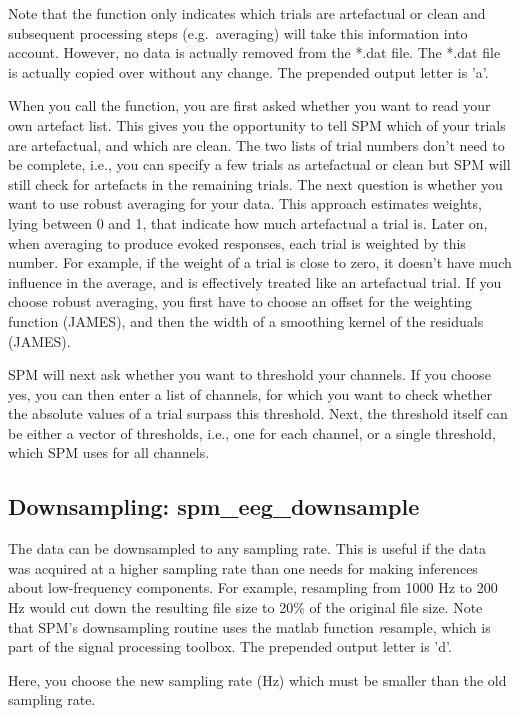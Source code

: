 Note that the function only indicates which trials are artefactual or
clean and subsequent processing steps (e.g.~averaging) will take this 
information into account. However, no data is actually removed from
the *.dat file. The *.dat file is actually copied over without any
change. The prepended output letter is 'a'.

When you call the function, you are first asked whether you want
to read your own artefact list. This gives you the opportunity to 
tell SPM which of your trials are artefactual, and which are clean. 
The two lists of trial numbers don't need to be complete, i.e., you can specify a
few trials as artefactual or clean but SPM will still check for artefacts in the remaining trials.
The next question is whether you want to use robust averaging for your data.
This approach estimates weights, lying between 0 and 1, that indicate how much 
artefactual a trial is. Later on, when averaging to produce evoked responses, 
each trial is weighted by this number. For example, if the weight of 
a trial is close to zero, it doesn't have much influence in the average, 
and is effectively treated like an artefactual trial. If you choose robust 
averaging, you first have to choose an offset for the weighting function
(JAMES), and then the width of a smoothing kernel of the residuals (JAMES).

SPM will next ask whether you want to threshold your channels. If you choose yes,
you can then enter a list of channels, for which you want to check whether 
the absolute values of a trial surpass this threshold. Next, the threshold
itself can be either a vector of thresholds, i.e., one for each channel, 
or a single threshold, which SPM uses for all channels.

\subsection{Downsampling: spm\_eeg\_downsample}
The data can be downsampled to any sampling rate. This is useful if
the data was acquired at a higher sampling rate than one needs for 
making inferences about low-frequency components. For example,
resampling from 1000 Hz to 200 Hz would cut down the resulting file
size to 20\% of the original file size. Note that SPM's downsampling
routine uses the matlab function {\textit resample}, which is part of
the signal processing toolbox. The prepended output letter is 'd'.

Here, you choose the new sampling rate (Hz) which must be smaller than the old sampling rate.

